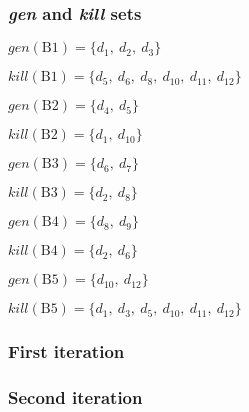 \subsubsection{\emph{gen} and \emph{kill} sets}

\newcommand{\blockn}{B1}
$gen(\text{B1}) = \{d_1,~d_2,~d_3\}$

$kill(\text{B1}) = \{d_5, ~d_6, ~d_8, ~d_{10}, ~d_{11}, ~d_{12}\}$

$gen(\text{B2}) = \{d_4,~d_5\}$

$kill(\text{B2}) = \{d_1,~ d_{10}\}$

$gen(\text{B3}) = \{d_6,~ d_7\}$

$kill(\text{B3}) = \{d_2,~ d_8\}$

$gen(\text{B4}) = \{d_8,~ d_9\}$

$kill(\text{B4}) = \{d_2,~ d_6\}$

$gen(\text{B5}) = \{d_{10},~ d_{12}\}$

$kill(\text{B5}) = \{d_1,~ d_3,~ d_5,~ d_{10},~ d_{11},~ d_{12}\}$

\subsubsection{First iteration}
\newcommand{\INBone}	{$\emptyset$}
\newcommand{\OUTBone}	{$\{d_{1},~ d_2,~ d_3\}$}
\newcommand{\INBtwo}	{\OUTBone}
\newcommand{\OUTBtwo}	{$\{d_2,~ d_3,~ d_4,~ d_5\}$}
\newcommand{\INBthree}	{\OUTBtwo}
\newcommand{\OUTBthree}	{$\{d_3,~ d_4,~ d_5,~ d_6,~ d_7\}$}
\newcommand{\INBfour}	{\OUTBtwo}
\newcommand{\OUTBfour}	{$\{d_3,~ d_4,~ d_5,~ d_8,~ d_9\}$}
\newcommand{\INBfive}	{$\{d_3,~ d_4,~ d_5,~ d_6,~ d_7,~ d_8,~ d_9\}$}
\newcommand{\OUTBfive}	{$\{d_1,~ d_4,~ d_6,~ d_7,~ d_8,~ d_9,~ d_{10},~ d_{12}\}$}



\subsubsection{Second iteration}
\renewcommand{\INBone}		{$\{d_1,~ d_4,~ d_6,~ d_7,~ d_8,~ d_9,~ d_{10},~ d_{12}\}$}
\renewcommand{\OUTBone}		{$\{d_1,~ d_2,~ d_3,~ d_4,~ d_7,~ d_9\}$}
\renewcommand{\INBtwo}		{\OUTBone}
\renewcommand{\OUTBtwo}		{$\{d_2,~ d_3,~ d_4,~ d_5,~ d_7,~ d_9\}$}
\renewcommand{\INBthree}	{\OUTBtwo}
\renewcommand{\OUTBthree}	{$\{d_3,~ d_4,~ d_5,~ d_6,~ d_7,~ d_9\}$}
\renewcommand{\INBfour}		{\OUTBtwo}
\renewcommand{\OUTBfour}	{$\{d_3,~ d_4,~ d_5,~ d_7,~ d_8,~ d_9\}$}
\renewcommand{\INBfive}		{$\{d_3,~ d_4,~ d_5,~ d_6,~ d_7,~ d_8,~ d_9\}$}
\renewcommand{\OUTBfive}	{$\{d_4,~ d_6,~ d_7,~ d_8,~ d_9,~ d_{10},~ d_{12}\}$}

